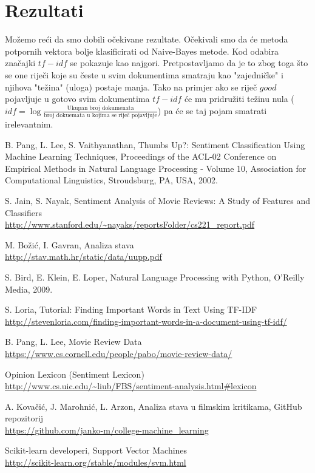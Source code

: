 \documentclass[conference]{IEEEtran}
\begin{document}
\section{Rezultati}
Možemo reći da smo dobili očekivane rezultate. Očekivali smo da će metoda
potpornih vektora bolje klasificirati od Naive-Bayes metode. Kod odabira
značajki $tf-idf$ se pokazuje kao najgori. Pretpostavljamo da je to zbog toga
što se one riječi koje su česte u svim dokumentima smatraju kao "zajedničke" i
njihova "težina" (uloga) postaje manja. Tako na primjer ako se riječ $good$
pojavljuje u gotovo svim dokumentima $tf-idf$ će mu pridružiti težinu nula
($idf=\log \frac{\text{Ukupan broj dokumenata}}{\text{broj dokuemata u kojima
se riječ pojavljuje}}$) pa će se taj pojam smatrati irelevantnim.
\begin{thebibliography}{1}

	B. Pang, L. Lee, S. Vaithyanathan,
 	Thumbs Up?: Sentiment Classification Using Machine Learning Techniques,
 	Proceedings of the ACL-02 Conference on Empirical Methods in Natural Language Processing - Volume 10,
 	Association for Computational Linguistics,
	Stroudsburg, PA, USA,
	2002.
	
	S. Jain, S. Nayak,
	Sentiment Analysis of Movie Reviews: A Study of Features and Classifiers\\
	\url{http://www.stanford.edu/~nayaks/reportsFolder/cs221_report.pdf}
	
	M. Božić, I. Gavran,
	Analiza stava\\
	\url{http://stav.math.hr/static/data/uupp.pdf}
	
	S. Bird, E. Klein, E. Loper,
	Natural Language Processing with Python,
	O'Reilly Media,
	2009.
	
	S. Loria,
	Tutorial: Finding Important Words in Text Using TF-IDF\\
	\url{http://stevenloria.com/finding-important-words-in-a-document-using-tf-idf/}

	B. Pang, L. Lee,
	Movie Review Data\\
	\url{https://www.cs.cornell.edu/people/pabo/movie-review-data/}
	
	Opinion Lexicon (Sentiment Lexicon)\\
	\url{http://www.cs.uic.edu/~liub/FBS/sentiment-analysis.html#lexicon}
	
	A. Kovačić, J. Marohnić, L. Arzon,
	Analiza stava u filmskim kritikama,
	GitHub repozitorij\\
	\url{https://github.com/janko-m/college-machine_learning}

    Scikit-learn developeri,
    Support Vector Machines\\
    \url{http://scikit-learn.org/stable/modules/svm.html}

\end{thebibliography}
\end{document}
